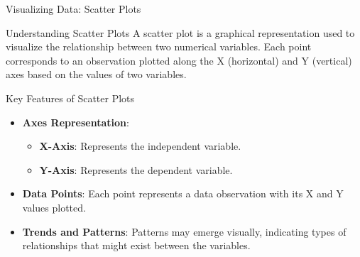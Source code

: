 \documentclass[aspectratio=169]{beamer}
\begin{document}
\begin{frame}[fragile]{Visualizing Data: Scatter Plots}
    \begin{block}{Understanding Scatter Plots}
        A scatter plot is a graphical representation used to visualize the relationship between two numerical variables. Each point corresponds to an observation plotted along the X (horizontal) and Y (vertical) axes based on the values of two variables.
    \end{block}
\end{frame}

\begin{frame}[fragile]{Key Features of Scatter Plots}
    \begin{itemize}
        \item \textbf{Axes Representation}:
            \begin{itemize}
                \item \textbf{X-Axis}: Represents the independent variable.
                \item \textbf{Y-Axis}: Represents the dependent variable.
            \end{itemize}
        
        \item \textbf{Data Points}: Each point represents a data observation with its X and Y values plotted.

        \item \textbf{Trends and Patterns}: Patterns may emerge visually, indicating types of relationships that might exist between the variables.
    \end{itemize}
\end{frame}
\end{document}
